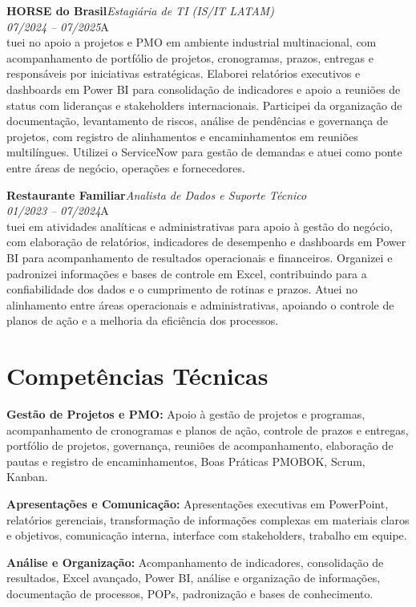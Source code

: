 \documentclass[11pt,a4paper]{article}
\newcommand{\cvrole}[4]{%
  \vspace{4pt}%
  {\bfseries\color{accentcolor}#1}\hfill{\itshape #2}\\[-2pt]%
  {\itshape #3}\hfill #4\\[6pt]%
}
\begin{document}
\cvrole{HORSE do Brasil}{Estagiária de TI (IS/IT LATAM)}{07/2024 -- 07/2025}

Atuei no apoio a projetos e PMO em ambiente industrial multinacional, com acompanhamento de portfólio de projetos, cronogramas, prazos, entregas e responsáveis por iniciativas estratégicas. Elaborei relatórios executivos e dashboards em Power BI para consolidação de indicadores e apoio a reuniões de status com lideranças e stakeholders internacionais. Participei da organização de documentação, levantamento de riscos, análise de pendências e governança de projetos, com registro de alinhamentos e encaminhamentos em reuniões multilíngues. Utilizei o ServiceNow para gestão de demandas e atuei como ponte entre áreas de negócio, operações e fornecedores.

\cvrole{Restaurante Familiar}{Analista de Dados e Suporte Técnico}{01/2023 -- 07/2024}

Atuei em atividades analíticas e administrativas para apoio à gestão do negócio, com elaboração de relatórios, indicadores de desempenho e dashboards em Power BI para acompanhamento de resultados operacionais e financeiros. Organizei e padronizei informações e bases de controle em Excel, contribuindo para a confiabilidade dos dados e o cumprimento de rotinas e prazos. Atuei no alinhamento entre áreas operacionais e administrativas, apoiando o controle de planos de ação e a melhoria da eficiência dos processos.

\section{Competências Técnicas}

\textbf{Gestão de Projetos e PMO:} Apoio à gestão de projetos e programas, acompanhamento de cronogramas e planos de ação, controle de prazos e entregas, portfólio de projetos, governança, reuniões de acompanhamento, elaboração de pautas e registro de encaminhamentos, Boas Práticas PMOBOK, Scrum, Kanban.

\textbf{Apresentações e Comunicação:} Apresentações executivas em PowerPoint, relatórios gerenciais, transformação de informações complexas em materiais claros e objetivos, comunicação interna, interface com stakeholders, trabalho em equipe.

\textbf{Análise e Organização:} Acompanhamento de indicadores, consolidação de resultados, Excel avançado, Power BI, análise e organização de informações, documentação de processos, POPs, padronização e bases de conhecimento.
\end{document}
